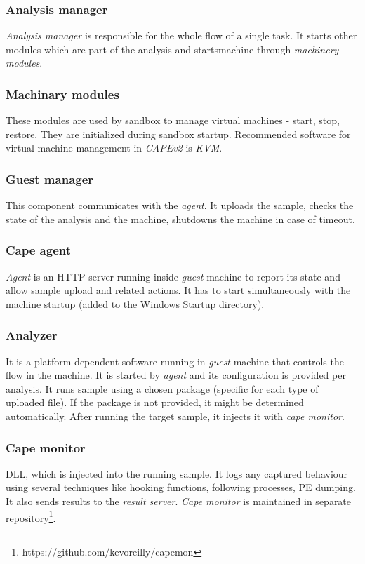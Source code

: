 \subsubsection*{Analysis manager}
\emph{Analysis manager} is responsible for the whole flow of a single task. It starts other modules which are part of the analysis and starts\stops machine through \emph{machinery modules}.

\subsubsection*{Machinary modules}
These modules are used by sandbox to manage virtual machines - start, stop, restore. They are initialized during sandbox startup. Recommended  software for virtual machine management in \emph{CAPEv2} is \emph{KVM}.

\subsubsection*{Guest manager}
This component communicates with the \emph{agent}. It uploads the sample, checks the state of the analysis and the machine, shutdowns the machine in case of timeout.

\subsubsection*{Cape agent}
\emph{Agent} is an HTTP server running inside \emph{guest} machine to report its state and allow sample upload and related actions. It has to start simultaneously with the machine startup (added to the Windows Startup directory).

\subsubsection*{Analyzer}
It is a platform-dependent software running in \emph{guest} machine that controls the flow in the machine. It is started by \emph{agent} and its configuration is provided per analysis. It runs sample using a chosen package (specific for each type of uploaded file). If the package is not provided, it might be determined automatically. After running the target sample, it injects it with \emph{cape monitor}.

\subsubsection*{Cape monitor}
DLL, which is injected into the running sample. It logs any captured behaviour using several techniques like hooking functions, following processes, PE dumping. It also sends results to the \emph{result server}. \emph{Cape monitor} is maintained in separate repository\footnote{https://github.com/kevoreilly/capemon}.

